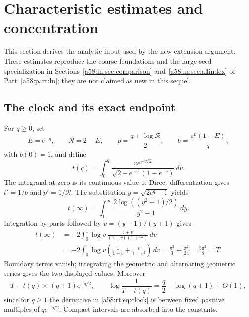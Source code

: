 \documentclass[11pt,letterpaper]{article}
\theoremstyle{remark}
\newcommand{\dd}{\,d}
\begin{document}
\section{Characteristic estimates and concentration}\label{a58:rt:sec:analytic}
This section derives the analytic input used by the new extension
argument. These estimates reproduce the coarse foundations and the
large-seed specialization in Sections~\ref{a58:ln:sec:comparison} and~\ref{a58:ln:sec:allindex} of Part~\ref{a58:part:ln};
they are not claimed as new in this sequel.

\subsection{The clock and its exact endpoint}
For $q\ge0$, set
\begin{equation}\label{a58:rt:eq:clockpars}
 E=e^{-q},\qquad \mathcal R=2-E,\qquad
 p=\frac{q+\log\mathcal R}{2},\qquad
 b=\frac{e^p(1-E)}q,
\end{equation}
with $b(0)=1$, and define
\begin{equation}\label{a58:rt:eq:clock}
 t(q)=\int_0^q\frac{v e^{-v/2}}{\sqrt{2-e^{-v}}(1-e^{-v})}\dd v.
\end{equation}
The integrand at zero is its continuous value $1$.
Direct differentiation gives $t'=1/b$ and $p'=1/\mathcal R$.
The substitution $y=\sqrt{2e^q-1}$ yields
\[
 t(\infty)=\int_1^\infty
 \frac{2\log((y^2+1)/2)}{y^2-1}\dd y.
\]
Integration by parts followed by $v=(y-1)/(y+1)$ gives
\begin{align*}
 t(\infty)
 &=-2\int_0^1\log v\,
     \frac{1+v}{(1-v)(1+v^2)}\dd v\\
 &=-2\int_0^1\log v
       \left(\frac1{1-v}+\frac{v}{1+v^2}\right)\dd v
 =\frac{\pi^2}{3}+\frac{\pi^2}{24}=\frac{3\pi^2}{8}=T.
\end{align*}
Boundary terms vanish; integrating the geometric and alternating
geometric series gives the two displayed values. Moreover
\begin{equation}\label{a58:rt:eq:clocktail}
 T-t(q)\asymp(q+1)e^{-q/2},\qquad
 \log\frac1{T-t(q)}=\frac q2-\log(q+1)+O(1),
\end{equation}
since for $q\ge1$ the derivative in \eqref{a58:rt:eq:clock} is between fixed
positive multiples of $qe^{-q/2}$. Compact intervals are absorbed into
the constants.
\end{document}

